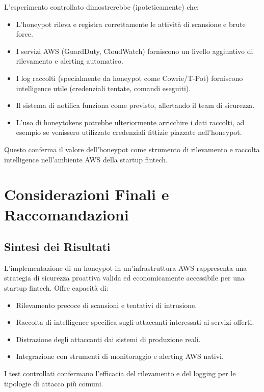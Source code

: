 \documentclass[a4paper,12pt]{report}
\begin{document}
L'esperimento controllato dimostrerebbe (ipoteticamente) che:
\begin{itemize}
    \item L'honeypot rileva e registra correttamente le attività di scansione e brute force.
    \item I servizi AWS (GuardDuty, CloudWatch) forniscono un livello aggiuntivo di rilevamento e alerting automatico.
    \item I log raccolti (specialmente da honeypot come Cowrie/T-Pot) forniscono intelligence utile (credenziali tentate, comandi eseguiti).
    \item Il sistema di notifica funziona come previsto, allertando il team di sicurezza.
    \item L'uso di honeytokens \cite{10183431} potrebbe ulteriormente arricchire i dati raccolti, ad esempio se venissero utilizzate credenziali fittizie piazzate nell'honeypot.
\end{itemize}
Questo conferma il valore dell'honeypot come strumento di rilevamento e raccolta intelligence nell'ambiente AWS della startup fintech.

\section{Considerazioni Finali e Raccomandazioni}
\label{sec:considerazioni_finali}

\subsection{Sintesi dei Risultati}
\label{subsec:sintesi_risultati}

L'implementazione di un honeypot in un'infrastruttura AWS rappresenta una strategia di sicurezza proattiva valida ed economicamente accessibile per una startup fintech. Offre capacità di:
\begin{itemize}
    \item Rilevamento precoce di scansioni e tentativi di intrusione.
    \item Raccolta di intelligence specifica sugli attaccanti interessati ai servizi offerti.
    \item Distrazione degli attaccanti dai sistemi di produzione reali.
    \item Integrazione con strumenti di monitoraggio e alerting AWS nativi.
\end{itemize}
I test controllati confermano l'efficacia del rilevamento e del logging per le tipologie di attacco più comuni.
\end{document}

